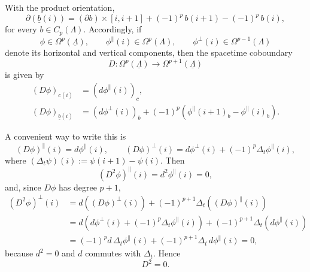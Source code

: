 \documentclass[dvipsnames,a4paper]{article}
\numberwithin{equation}{section}
\theoremstyle{definition}
\theoremstyle{remark}
\begin{document}
With the product orientation,
\begin{equation}
	\partial\left(\underline b(i)\right)
	=
	(\partial b)\times[i,i+1]
	+(-1)^p\,b(i+1)-(-1)^p\,b(i),
	\label{eq:product-boundary}
\end{equation}
for every \(b\in C_p(\Lambda)\). Accordingly, if
\begin{equation}
	\phi\in \Omega^p(\underline\Lambda),
	\qquad
	\phi^\parallel(i)\in \Omega^p(\Lambda),
	\qquad
	\phi^\perp(i)\in \Omega^{p-1}(\Lambda)
\end{equation}
denote its horizontal and vertical components, then the spacetime coboundary
\begin{equation}
	D:\Omega^p(\underline\Lambda)\to \Omega^{p+1}(\underline\Lambda)
\end{equation}
is given by
\begin{subequations}
	\begin{align}
		(D\phi)_{c(i)}
		&=
		\left(d\phi^\parallel(i)\right)_c,
		\label{eq:D-horizontal-components}
		\\
		(D\phi)_{\underline b(i)}
		&=
		\left(d\phi^\perp(i)\right)_b
		+
		(-1)^p\left(\phi^\parallel(i+1)_b-\phi^\parallel(i)_b\right).
		\label{eq:D-vertical-components}
	\end{align}
	\label{eq:D-components}
\end{subequations}

A convenient way to write this is
\begin{equation}
	(D\phi)^\parallel(i)=d\phi^\parallel(i),
	\qquad
	(D\phi)^\perp(i)=d\phi^\perp(i)+(-1)^p\Delta_t\phi^\parallel(i),
\end{equation}
where \((\Delta_t\psi)(i):=\psi(i+1)-\psi(i)\). Then
\begin{equation}
	(D^2\phi)^\parallel(i)=d^2\phi^\parallel(i)=0,
\end{equation}
and, since \(D\phi\) has degree \(p+1\),
\begin{align*}
	(D^2\phi)^\perp(i)
	&=
	d\left((D\phi)^\perp(i)\right)+(-1)^{p+1}\Delta_t\left((D\phi)^\parallel(i)\right)\\
	&=
	d\left(d\phi^\perp(i)+(-1)^p\Delta_t\phi^\parallel(i)\right)
	+(-1)^{p+1}\Delta_t\left(d\phi^\parallel(i)\right)\\
	&=
	(-1)^p d\,\Delta_t\phi^\parallel(i)+(-1)^{p+1}\Delta_t\,d\phi^\parallel(i)=0,
\end{align*}
because \(d^2=0\) and \(d\) commutes with \(\Delta_t\). Hence
\begin{equation}
	D^2=0.
	\label{eq:D2-zero}
\end{equation}
\end{document}
